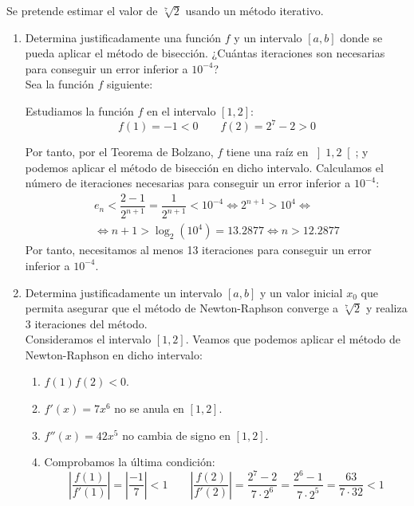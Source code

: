 \begin{ejercicio}
    Se pretende estimar el valor de $\sqrt[7]{2}$ usando un método iterativo.
    \begin{enumerate}
        \item Determina justificadamente una función $f$ y un intervalo $[a, b]$ donde se pueda aplicar el método de bisección. ¿Cuántas iteraciones son necesarias para conseguir un error inferior a $10^{-4}$?\\
        
        Sea la función $f$ siguiente:

        Estudiamos la función $f$ en el intervalo $[1, 2]$:
        \begin{equation*}
            f(1)=-1<0\qquad f(2)=2^7-2>0
        \end{equation*}

        Por tanto, por el Teorema de Bolzano, $f$ tiene una raíz en $\left]1, 2\right[$; y podemos aplicar el método de bisección en dicho intervalo. Calculamos el número de iteraciones necesarias para conseguir un error inferior a $10^{-4}$:
        \begin{multline*}
            e_n < \dfrac{2-1}{2^{n+1}} = \dfrac{1}{2^{n+1}} < 10^{-4}\iff 2^{n+1} > 10^4\iff\\\iff n+1 > \log_2(10^4) = 13.2877\iff n>12.2877
        \end{multline*}
        Por tanto, necesitamos al menos 13 iteraciones para conseguir un error inferior a $10^{-4}$.


        \item Determina justificadamente un intervalo $[a, b]$ y un valor inicial $x_0$ que permita asegurar que el método de Newton-Raphson converge a $\sqrt[7]{2}$ y realiza 3 iteraciones del método.\\
        
        Consideramos el intervalo $[1, 2]$. Veamos que podemos aplicar el método de Newton-Raphson en dicho intervalo:
        \begin{enumerate}
            \item $f(1)f(2)<0$.
            \item $f'(x)=7x^6$ no se anula en $\left[1, 2\right]$.
            \item $f''(x)=42x^5$ no cambia de signo en $\left[1, 2\right]$.
            \item Comprobamos la última condición:
            \begin{equation*}
                \left|\dfrac{f(1)}{f'(1)}\right| = \left|\dfrac{-1}{7}\right|<1
                \qquad \left|\dfrac{f(2)}{f'(2)}\right| = \dfrac{2^7-2}{7\cdot 2^6} = \dfrac{2^6-1}{7\cdot 2^5} = \dfrac{63}{7\cdot 32}<1
            \end{equation*}
        \end{enumerate}


\end{enumerate}
\end{ejercicio}
